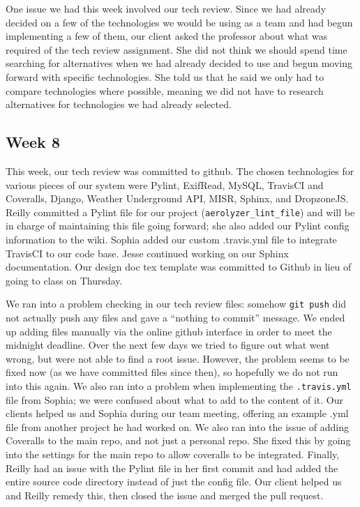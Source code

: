 \documentclass[onecolumn, draftclsnofoot,10pt, compsoc]{IEEEtran}
\begin{document}
\begin{flushleft}
\medskip

One issue we had this week involved our tech review. Since we had already decided on a few of the technologies we would be using as a team and had begun implementing a few of them, our client asked the professor about what was required of the tech review assignment. She did not think we should spend time searching for alternatives when we had already decided to use and begun moving forward with specific technologies. She told us that he said we only had to compare technologies where possible, meaning we did not have to research alternatives for technologies we had already selected.

\subsection{Week 8}
This week, our tech review was committed to github. The chosen technologies for various pieces of our system were Pylint, ExifRead, MySQL, TravisCI and Coveralls, Django, Weather Underground API, MISR, Sphinx, and DropzoneJS. Reilly committed a Pylint file for our project (\texttt{aerolyzer\_lint\_file}) and will be in charge of maintaining this file going forward; she also added our Pylint config information to the wiki. Sophia added our custom .travis.yml file to integrate TravisCI to our code base. Jesse continued working on our Sphinx documentation. Our design doc tex template was committed to Github in lieu of going to class on Thursday. 

\medskip

We ran into a problem checking in our tech review files: somehow \texttt{git push} did not actually push any files and gave a “nothing to commit” message. We ended up adding files manually via the online github interface in order to meet the midnight deadline. Over the next few days we tried to figure out what went wrong, but were not able to find a root issue. However, the problem seems to be fixed now (as we have committed files since then), so hopefully we do not run into this again. We also ran into a problem when implementing the \texttt{.travis.yml} file from Sophia; we were confused about what to add to the content of it. Our clients helped us and Sophia during our team meeting, offering an example .yml file from another project he had worked on. We also ran into the issue of adding Coveralls to the main repo, and not just a personal repo. She fixed this by going into the settings for the main repo to allow coveralls to be integrated. Finally, Reilly had an issue with the Pylint file in her first commit and had added the entire source code directory instead of just the config file. Our client helped us and Reilly remedy this, then closed the issue and merged the pull request.


\end{flushleft}
\end{document}
